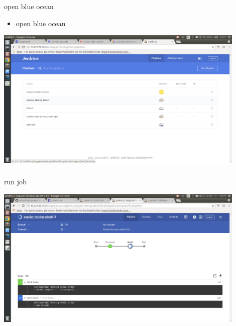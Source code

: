 \documentclass{beamer}
\begin{document}
\begin{frame}\frametitle{} 

\begin{block}{open blue ocean}
\begin{itemize}
\item open blue ocean
\end{itemize}
\end{block}


\begin{center}
\includegraphics[width=0.9\textwidth]{jenkins-blue-ocean.png}
\end{center}

\end{frame}



\begin{frame}\frametitle{} 

\begin{block}{run job}
\end{block}


\begin{center}
\includegraphics[width=0.9\textwidth]{jenkins-build.png}
\end{center}

\end{frame}
\end{document}
